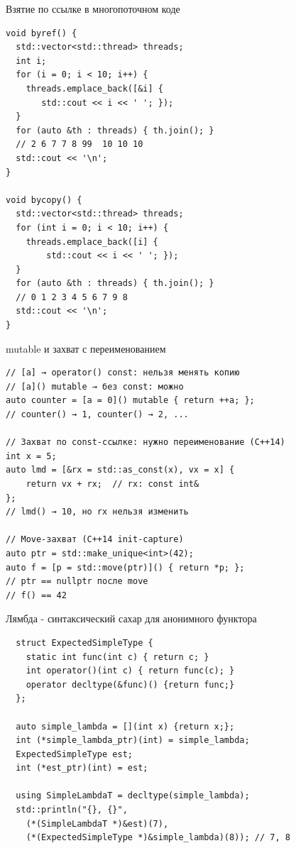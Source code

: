 \documentclass{beamer}
\begin{document}
\begin{frame}[fragile]{Взятие по ссылке в многопоточном коде}
\begin{lstlisting}
void byref() {
  std::vector<std::thread> threads;
  int i;
  for (i = 0; i < 10; i++) {
    threads.emplace_back([&i] {
       std::cout << i << ' '; });
  }
  for (auto &th : threads) { th.join(); }
  // 2 6 7 7 8 99  10 10 10
  std::cout << '\n';
}

void bycopy() {
  std::vector<std::thread> threads;
  for (int i = 0; i < 10; i++) {
    threads.emplace_back([i] {
        std::cout << i << ' '; });
  }
  for (auto &th : threads) { th.join(); }
  // 0 1 2 3 4 5 6 7 9 8
  std::cout << '\n';
}
\end{lstlisting}
\end{frame}



\begin{frame}[fragile]{mutable и захват с переименованием}
\begin{lstlisting}
// [a] → operator() const: нельзя менять копию
// [a]() mutable → без const: можно
auto counter = [a = 0]() mutable { return ++a; };
// counter() → 1, counter() → 2, ...

// Захват по const-ссылке: нужно переименование (C++14)
int x = 5;
auto lmd = [&rx = std::as_const(x), vx = x] {
    return vx + rx;  // rx: const int&
};
// lmd() → 10, но rx нельзя изменить

// Move-захват (C++14 init-capture)
auto ptr = std::make_unique<int>(42);
auto f = [p = std::move(ptr)]() { return *p; };
// ptr == nullptr после move
// f() == 42
\end{lstlisting}
\end{frame}

\begin{frame}[fragile]{Лямбда - синтаксический сахар для анонимного функтора}
\begin{lstlisting}
  struct ExpectedSimpleType {
    static int func(int c) { return c; }
    int operator()(int c) { return func(c); }
    operator decltype(&func)() {return func;}
  };

  auto simple_lambda = [](int x) {return x;};
  int (*simple_lambda_ptr)(int) = simple_lambda;
  ExpectedSimpleType est;
  int (*est_ptr)(int) = est;

  using SimpleLambdaT = decltype(simple_lambda);
  std::println("{}, {}",
    (*(SimpleLambdaT *)&est)(7),
    (*(ExpectedSimpleType *)&simple_lambda)(8)); // 7, 8
\end{lstlisting}
\end{frame}
\end{document}
